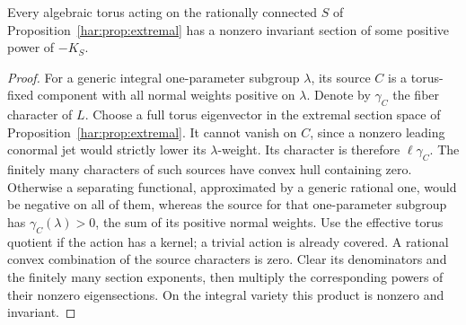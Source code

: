 \begin{corollary}\label{har:cor:torus}
Every algebraic torus acting on the rationally connected \(S\) of
Proposition~\ref{har:prop:extremal} has a nonzero invariant section of
some positive power of \(-K_S\).
\end{corollary}

\begin{proof}
For a generic integral one-parameter subgroup \(\lambda\), its source
\(C\) is a torus-fixed component with all normal weights positive
on \(\lambda\). Denote by \(\gamma_C\) the fiber character of \(L\).
Choose a full torus eigenvector in the extremal section space of
Proposition~\ref{har:prop:extremal}. It cannot vanish on \(C\), since
a nonzero leading conormal jet would strictly lower its
\(\lambda\)-weight. Its character is therefore \(\ell\gamma_C\).
The finitely many characters of such sources have convex hull
containing zero. Otherwise a separating functional, approximated by
a generic rational one, would be negative on all of them, whereas
the source for that one-parameter subgroup has
\(\gamma_C(\lambda)>0\), the sum of its positive normal weights.
Use the effective torus quotient if the action has a kernel; a trivial
action is already covered. A rational convex combination of the source
characters is zero. Clear its denominators and the finitely many
section exponents, then multiply the corresponding powers of their
nonzero eigensections. On the integral variety this product is nonzero
and invariant.
\end{proof}
